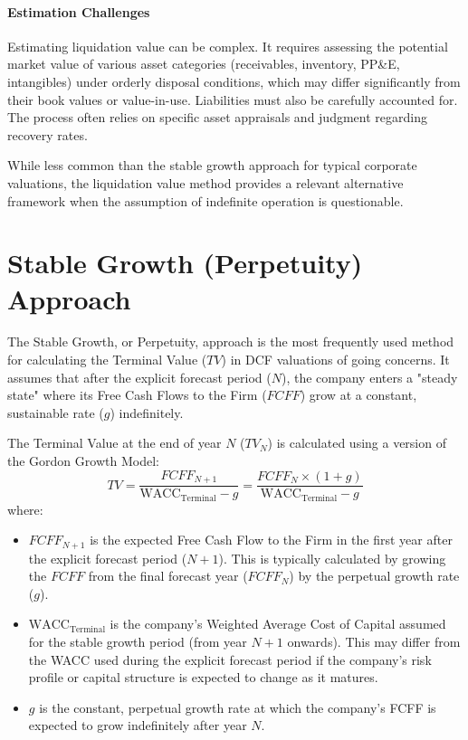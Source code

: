\paragraph{Estimation Challenges}
Estimating liquidation value can be complex. It requires assessing the potential market value of various asset categories (receivables, inventory, PP\&E, intangibles) under orderly disposal conditions, which may differ significantly from their book values or value-in-use. Liabilities must also be carefully accounted for. The process often relies on specific asset appraisals and judgment regarding recovery rates.

While less common than the stable growth approach for typical corporate valuations, the liquidation value method provides a relevant alternative framework when the assumption of indefinite operation is questionable.

\section{Stable Growth (Perpetuity) Approach} \label{sec:stable_growth_value}
The Stable Growth, or Perpetuity, approach is the most frequently used method for calculating the Terminal Value (\(TV\)) in DCF valuations of going concerns. It assumes that after the explicit forecast period (\(N\)), the company enters a "steady state" where its Free Cash Flows to the Firm (\(FCFF\)) grow at a constant, sustainable rate (\(g\)) indefinitely.

The Terminal Value at the end of year \(N\) (\(TV_N\)) is calculated using a version of the Gordon Growth Model:
\begin{equation} \label{eq:terminal_value_stable_growth}
    TV = \frac{FCFF_{N+1}}{\text{WACC}_{\text{Terminal}} - g} = \frac{FCFF_N \times (1+g)}{\text{WACC}_{\text{Terminal}} - g}
\end{equation}
where:
\begin{itemize}
    \item \(FCFF_{N+1}\) is the expected Free Cash Flow to the Firm in the first year after the explicit forecast period (\(N+1\)). This is typically calculated by growing the \(FCFF\) from the final forecast year (\(FCFF_N\)) by the perpetual growth rate (\(g\)).
    \item \(\text{WACC}_{\text{Terminal}}\) is the company's Weighted Average Cost of Capital assumed for the stable growth period (from year \(N+1\) onwards). This may differ from the WACC used during the explicit forecast period if the company's risk profile or capital structure is expected to change as it matures.
    \item \(g\) is the constant, perpetual growth rate at which the company's FCFF is expected to grow indefinitely after year \(N\).
\end{itemize}

